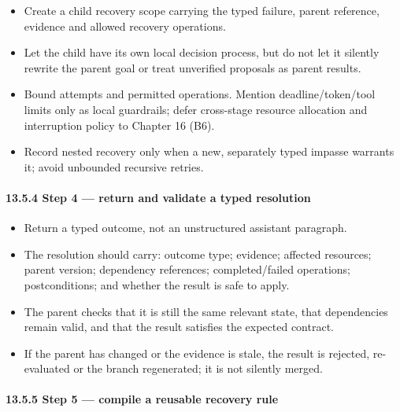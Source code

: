 \begin{itemize}
\tightlist
\item
  Create a child recovery scope carrying the typed failure, parent reference, evidence and allowed recovery operations.
\item
  Let the child have its own local decision process, but do not let it silently rewrite the parent goal or treat unverified proposals as parent results.
\item
  Bound attempts and permitted operations. Mention deadline/token/tool limits only as local guardrails; defer cross-stage resource allocation and interruption policy to Chapter 16 (B6).
\item
  Record nested recovery only when a new, separately typed impasse warrants it; avoid unbounded recursive retries.
\end{itemize}

\paragraph{13.5.4 Step 4 --- return and validate a typed resolution}\label{1354-step-4--return-and-validate-a-typed-resolution}

\begin{itemize}
\tightlist
\item
  Return a typed outcome, not an unstructured assistant paragraph.
\item
  The resolution should carry: outcome type; evidence; affected resources; parent version; dependency references; completed/failed operations; postconditions; and whether the result is safe to apply.
\item
  The parent checks that it is still the same relevant state, that dependencies remain valid, and that the result satisfies the expected contract.
\item
  If the parent has changed or the evidence is stale, the result is rejected, re-evaluated or the branch regenerated; it is not silently merged.
\end{itemize}

\paragraph{13.5.5 Step 5 --- compile a reusable recovery rule}\label{1355-step-5--compile-a-reusable-recovery-rule}

